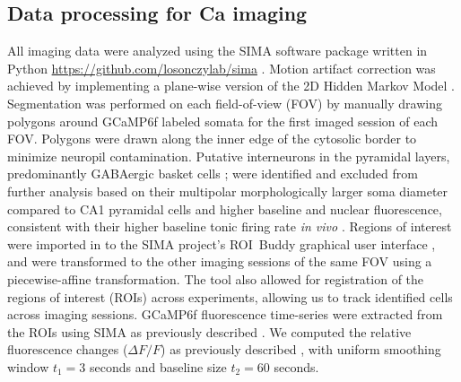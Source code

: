 \subsection{Data processing for Ca imaging}\label{sec:methods:processing}
All imaging data were analyzed using the SIMA software package written in Python \url{https://github.com/losonczylab/sima} \citep{Kaifosh2014}. Motion artifact correction was achieved by implementing a plane-wise version of the 2D Hidden Markov Model \citep{Dombeck2010, Kaifosh2013, Kaifosh2014}. Segmentation was performed on each field-of-view (FOV) by manually drawing polygons around GCaMP6f labeled somata for the first imaged session of each FOV. Polygons were drawn along the inner edge of the cytosolic border to minimize neuropil contamination. Putative interneurons in the pyramidal layers, predominantly GABAergic basket cells \citep{Bezaire2013, Freund1996, Klausberger2008}; were identified and excluded from further analysis based on their multipolar morphologically larger soma diameter compared to CA1 pyramidal cells \citep{Ambros-Ingerson2005, Gulyas1999a, Papp2013} and higher baseline and nuclear fluorescence, consistent with their higher baseline tonic firing rate \emph{in vivo} \citep{Klausberger2003, Klausberger2003, Lapray2012, Varga2012}. Regions of interest were imported in to the SIMA project's ROI~Buddy graphical user interface \citep{Kaifosh2014}, and were transformed to the other imaging sessions of the same FOV using a piecewise-affine transformation. The tool also allowed for registration of the regions of interest (ROIs) across experiments, allowing us to track identified cells across imaging sessions. GCaMP6f fluorescence time-series were extracted from the ROIs using SIMA as previously described \citep{Kaifosh2014}. We computed the relative fluorescence changes ($\Delta F/F$) as previously described \citep{Jia2011}, with uniform smoothing window $t_1 = 3$ seconds and baseline size $t_2 = 60$ seconds.

